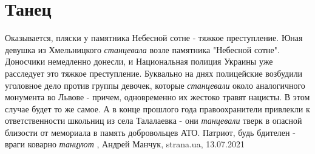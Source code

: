  
 
 
 
 
\chapter{Танец}
\label{sec:slova.tanec}

Оказывается, пляски у памятника Небесной сотне - тяжкое преступление.  Юная
девушка из Хмельницкого \emph{станцевала} возле памятника "Небесной сотне".  Доносчики
немедленно донесли, и Национальная полиция Украины уже расследует это тяжкое
преступление.  Буквально на днях полицейские возбудили уголовное дело против
группы девочек, которые \emph{станцевали} около аналогичного монумента во Львове -
причем, одновременно их жестоко травят нацисты. В этом случае будет то же
самое.  А в конце прошлого года правоохранители привлекли к ответственности
школьниц из села Талалаевка - они \emph{танцевали} тверк в опасной близости от
мемориала в память добровольцев АТО. Патриот, будь бдителен - враги коварно
\emph{танцуют}
, Андрей Манчук, strana.ua, 13.07.2021

